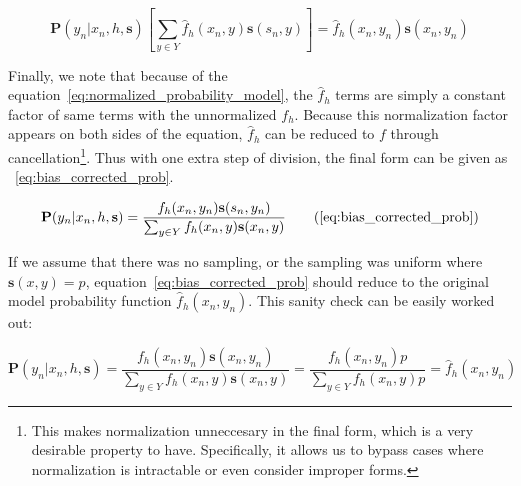 \documentclass[twoside]{article}
\begin{document}
\begin{appendices}
\[\mathbf{P}(y_n|x_n,h,\mathbf{s})\left [\sum_{y \in Y}\hat{f}_h(x_n,y)\mathbf{s}(s_n,y) \right ]=\hat{f}_h(x_n,y_n)\mathbf{s}(x_n,y_n) \]

Finally, we note that because of the equation~\eqref{eq:normalized_probability_model}, the \(\hat{f}_h\) terms are simply a constant factor of same terms with the unnormalized \(f_h\). Because this normalization factor appears on both sides of the equation, \(\hat{f}_h\) can be reduced to \(f\) through cancellation\footnote{This makes normalization unneccesary in the final form, which is a very desirable property to have. Specifically, it allows us to bypass cases where normalization is intractable or even consider improper forms.}. Thus with one extra step of division, the final form can be given as ~\eqref{eq:bias_corrected_prob}.

\begin{equation}
\mathbf{P}(y_n|x_n,h,\mathbf{s})=\dfrac{f_h(x_n,y_n)\mathbf{s}(s_n,y_n)}{\sum_{y \in Y}f_h(x_n,y)\mathbf{s}(x_n,y)}
\tag{\ref{eq:bias_corrected_prob}}
\end{equation}

If we assume that there was no sampling, or the sampling was uniform where \(\mathbf{s}(x,y)=p\), equation~\eqref{eq:bias_corrected_prob} should reduce to the original model probability function \(\hat{f}_h(x_n,y_n)\). This sanity check can be easily worked out:

\[\mathbf{P}(y_n|x_n,h,\mathbf{s})=\frac{f_h(x_n,y_n)\mathbf{s}(x_n,y_n)}{\sum_{y \in Y}f_h(x_n,y)\mathbf{s}(x_n,y)}=\frac{f_h(x_n,y_n)p}{\sum_{y \in Y}f_h(x_n,y)p} =\hat{f}_h(x_n,y_n)\]

\end{appendices}

\end{document}
